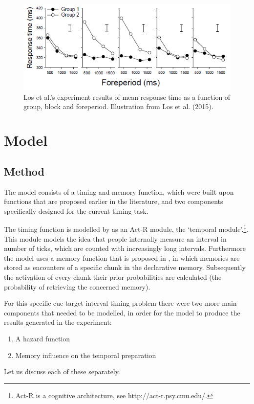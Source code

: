 \documentclass[10pt,letterpaper]{article}
\begin{document}
\begin{figure}
	\centering
	\includegraphics[width=\columnwidth]{Los1.png}
	\caption{Los et al.'s experiment results of mean response time as a function of group, block and foreperiod. Illustration from Los et al. (2015).}
	\label{LosFigure}
\end{figure}

\section{Model}
\subsection{Method}
The model consists of a timing and memory function, which were built upon functions that are proposed earlier in the literature, and two components specifically designed for the current timing task. 

The timing function is modelled by \citet{Taatgen1} as an Act-R module, the `temporal module'.\footnote{Act-R is a cognitive architecture, see http://act-r.psy.cmu.edu/.}. This module models the idea that people internally measure an interval in number of ticks, which are counted with increasingly long intervals. Furthermore the model uses a memory function that is proposed in \citet{Taatgen}, in which memories are stored as encounters of a specific chunk in the declarative memory. Subsequently the activation of every chunk their prior probabilities are calculated (the probability of retrieving the concerned memory).

For this specific cue target interval timing problem there were two more main components that needed to be modelled, in order for the model to produce the results generated in the experiment:
\begin{enumerate}
	\item A hazard function
	\item Memory influence on the temporal preparation
\end{enumerate}
Let us discuss each of these separately.
\end{document}
